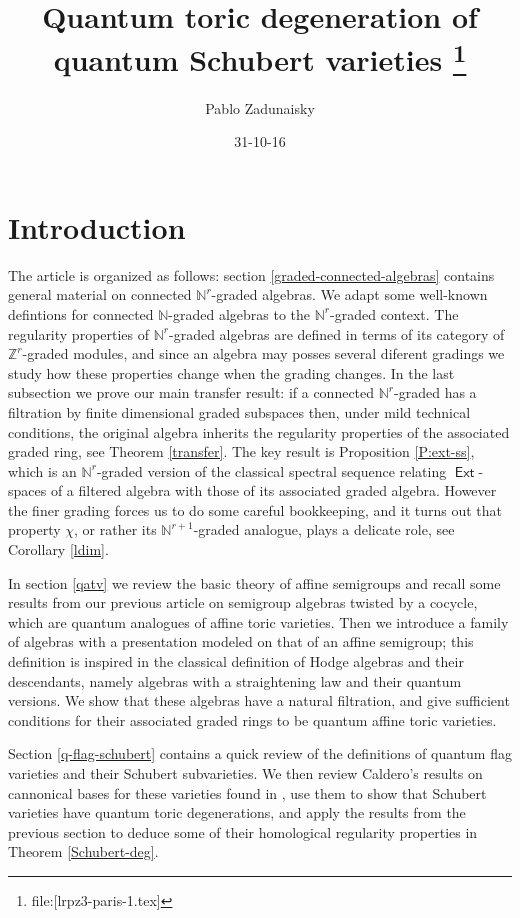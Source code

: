 \documentclass[11pt,fleqn]{article}
\title{
Quantum toric degeneration of quantum Schubert varieties
\footnote{file:[lrpz3-paris-1.tex]}
}
\date{31-10-16}
\author{Pablo Zadunaisky}
\newcommand\NN{\mathbb N}
\newcommand\ZZ{\mathbb Z}
\DeclareMathOperator\Ext{\mathsf{Ext}}
\begin{document}
\maketitle


\section{Introduction}

The article is organized as follows: section \ref{graded-connected-algebras} 
contains general material on connected $\NN^r$-graded algebras. We adapt some 
well-known defintions for connected $\NN$-graded algebras to the 
$\NN^r$-graded context. The regularity properties of $\NN^r$-graded algebras 
are defined in terms of its category of $\ZZ^r$-graded modules, and since an 
algebra may posses several diferent gradings we study how these properties 
change when the grading changes. In the last subsection we 
prove our main transfer result: if a connected $\NN^r$-graded has a filtration 
by finite dimensional graded subspaces then, under mild technical conditions, 
the original algebra inherits the regularity properties of the associated 
graded ring, see Theorem \ref{transfer}. The key result is Proposition 
\ref{P:ext-ss}, which is an $\NN^r$-graded version of the classical spectral 
sequence relating $\Ext$-spaces of a filtered algebra with those of its 
associated graded algebra. However the finer grading forces us 
to do some careful bookkeeping, and it turns out that property $\chi$, or 
rather its $\NN^{r+1}$-graded analogue, plays a delicate role, see Corollary 
\ref{ldim}.

In section \ref{qatv} we review the basic theory of affine semigroups and recall some 
results from our previous article \cite{RZ2} on semigroup algebras twisted by a cocycle, 
which are quantum analogues of affine toric varieties. Then we introduce a family of 
algebras with a presentation modeled on that of an affine semigroup; this definition is 
inspired in the classical definition of Hodge algebras and their descendants, namely 
algebras with a straightening law and their quantum versions. We show that these 
algebras have a natural filtration, and give  sufficient conditions for their associated 
graded rings to be quantum affine toric varieties.

Section \ref{q-flag-schubert} contains a quick review of the definitions of quantum flag
varieties and their Schubert subvarieties. We then review Caldero's results on 
cannonical bases for these varieties found in \cite{C}, use them to show that Schubert 
varieties have quantum toric degenerations, and apply the results from the previous
section to deduce some of their homological regularity properties in Theorem 
\ref{Schubert-deg}. 
\end{document}
